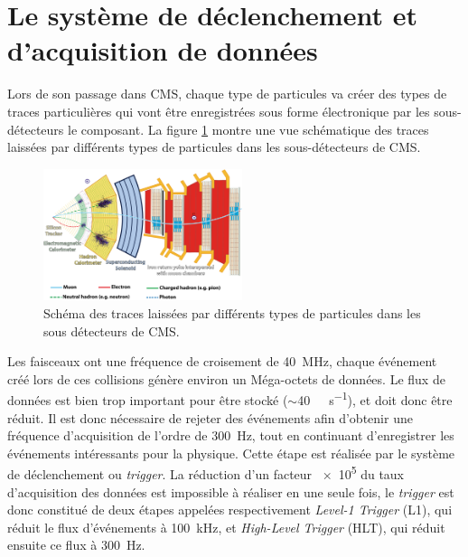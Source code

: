 \section{Le système de déclenchement et d'acquisition de données}
Lors de son passage dans CMS, chaque type de particules va créer des types de traces particulières qui vont être enregistrées sous forme électronique par les sous-détecteurs le composant. La figure \ref{particules} montre une vue schématique des traces laissées par différents types de particules dans les sous-détecteurs de CMS.

	  \begin{figure}[ht!]
	\centering
	\includegraphics[width=0.52\textwidth]{CMS/particles.png}
	\captionsetup{type=figure}\caption{Schéma des traces laissées par différents types de particules dans les sous détecteurs de CMS.}
	\label{particules}
\end{figure}

Les faisceaux ont une fréquence de croisement de \SI{40}{\mega\hertz}, chaque événement créé lors de ces collisions génère environ un Méga-octets de données. Le flux de données est bien trop important pour être stocké ($\sim$\SI{40}{\tera\byte\per\second}), et doit donc être réduit. Il est donc nécessaire de rejeter des événements afin d'obtenir une fréquence d'acquisition de l'ordre de \SI{300}{\hertz}, tout en continuant d'enregistrer les événements intéressants pour la physique. Cette étape est réalisée par le système de déclenchement ou \textit{trigger}. La réduction d'un facteur \num{e5} du taux d'acquisition des données est impossible à réaliser en une seule fois, le \textit{trigger} est donc constitué de deux étapes appelées respectivement \textit{Level-1 Trigger} (L1), qui réduit le flux d'événements à \SI{100}{\kilo\hertz}, et \textit{High-Level Trigger} (HLT), qui réduit ensuite ce flux à \SI{300}{\hertz}.

